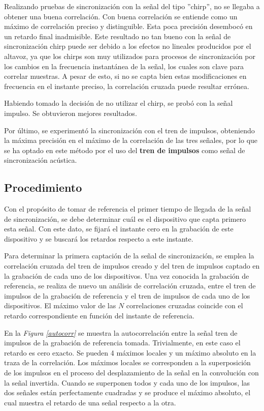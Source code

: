\documentclass[a4paper,11pt]{book}
\begin{document}
Realizando pruebas de sincronización con la señal del tipo ''chirp'', no se llegaba a obtener una buena correlación. Con buena correlación se entiende como un máximo de correlación preciso y distinguible. Esta poca precisión desembocó en un retardo final inadmisible. Este resultado no tan bueno con la señal de sincronización chirp puede ser debido a los efectos no lineales producidos por el altavoz, ya que los chirps son muy utilizados para procesos de sincronización por los cambios en la frecuencia instantánea de la señal, los cuales son clave para correlar muestras. A pesar de esto, si no se capta bien estas modificaciones en frecuencia en el instante preciso, la correlación cruzada puede resultar errónea.

Habiendo tomado la decisión de no utilizar el chirp, se probó con la señal impulso. Se obtuvieron mejores resultados.

Por último, se experimentó la sincronización con el tren de impulsos, obteniendo la máxima precisión en el máximo de la correlación de las tres señales, por lo que se ha optado en este método por el uso del \textbf{tren de impulsos} como señal de sincronización acústica.

\subsection{Procedimiento}

Con el propósito de tomar de referencia el primer tiempo de llegada de la señal de sincronización, se debe determinar cuál es el dispositivo que capta primero esta señal. Con este dato, se fijará el instante cero en la grabación de este dispositivo y se buscará los retardos respecto a este instante.

Para determinar la primera captación de la señal de sincronización, se emplea la correlación cruzada del tren de impulsos creado y del tren de impulsos captado en la grabación de cada uno de los dispositivos. Una vez conocida la grabación de referencia, se realiza de nuevo un análisis de correlación cruzada, entre el tren de impulsos de la grabación de referencia y el tren de impulsos de cada uno de los dispositivos. El máximo valor de las $N$ correlaciones cruzadas coincide con el retardo correspondiente en función del instante de referencia.

En la \textit{Figura \ref{autocorr}} se muestra la autocorrelación entre la señal tren de impulsos de la grabación de referencia tomada. Trivialmente, en este caso el retardo es cero exacto. Se pueden 4 máximos locales y un máximo absoluto en la traza de la correlación. Los máximos locales se corresponden a la superposición de los impulsos en el proceso del desplazamiento de la señal en la convolución con la señal invertida. Cuando se superponen todos y cada uno de los impulsos, las dos señales están perfectamente cuadradas y se produce el máximo absoluto, el cual muestra el retardo de una señal respecto a la otra.
\end{document}
